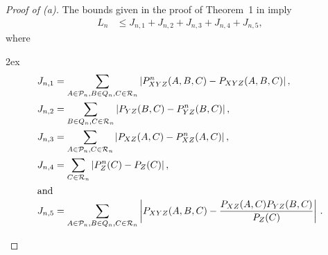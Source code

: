 \documentclass[11pt]{article}
\def\Q{Q}
\def\P{\mathcal{P}}
\def\PROB {{\mathbb P}}
\begin{document}
\begin{proof}[Proof of (a)] 
The bounds given in the proof of Theorem~1 in  \cite{GyWa12}  imply
\begin{align*}
L_n
&\le
J_{n,1}+J_{n,2}+J_{n,3}+J_{n,4}+J_{n,5},
\end{align*}
where
\begin{spreadlines}{2ex} 
\begin{align*}
J_{n,1}
&=
\sum_{A\in \P_n,B\in \Q_n,C\in {\cal R}_n}
\left|P^n_{XYZ}(A,B,C)
-P_{XYZ}(A,B,C)
\right|  , \\
J_{n,2}
&=
\sum_{B\in \Q_n,C\in {\cal R}_n}
\left|P_{YZ}(B,C)
-P^n_{YZ}(B,C)
\right| ,   \\
J_{n,3} &=
\sum_{A\in \P_n,C\in {\cal R}_n}
\left|P_{XZ}(A,C)-P^n_{XZ}(A,C)\right|, \\
J_{n,4}
&=
\sum_{C\in {\cal R}_n} \left|P^n_{Z}(C)-P_Z(C)\right| , \\
\intertext{and} 
J_{n,5}
&=
\sum_{A\in \P_n,B\in \Q_n,C\in {\cal R}_n}
\left|P_{XYZ}(A,B,C)
-\frac{P_{XZ}(A,C)P_{YZ}(B,C)}{P_{Z}(C)}
\right| \, .
\end{align*}
\end{spreadlines}


\end{proof}
\end{document}
